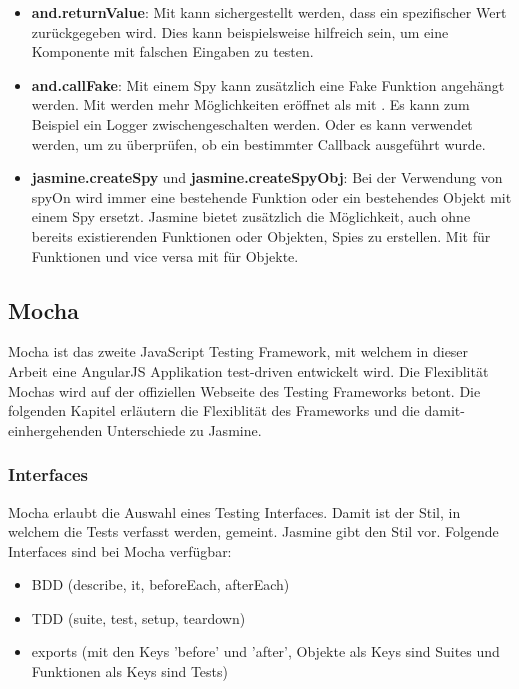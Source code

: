 \begin{itemize}
  \item \textbf{and.returnValue}: \newline
  Mit  kann sichergestellt werden, dass ein spezifischer Wert zurückgegeben wird. Dies kann beispielsweise hilfreich sein, um eine Komponente mit falschen Eingaben zu testen.

  \item \textbf{and.callFake}: \newline
  Mit einem Spy kann zusätzlich eine Fake Funktion angehängt werden. Mit  werden mehr Möglichkeiten eröffnet als mit . Es kann zum Beispiel ein Logger zwischengeschalten werden. Oder es kann verwendet werden, um zu überprüfen, ob ein bestimmter Callback ausgeführt wurde.

  \item \textbf{jasmine.createSpy} und \textbf{jasmine.createSpyObj}: \newline
  Bei der Verwendung von spyOn wird immer eine bestehende Funktion oder ein bestehendes Objekt mit einem Spy ersetzt. Jasmine bietet zusätzlich die Möglichkeit, auch ohne bereits existierenden Funktionen oder Objekten, Spies zu erstellen. Mit  für Funktionen und vice versa mit  für Objekte.

\end{itemize}

\newpage
\subsection{Mocha}
Mocha ist das zweite JavaScript Testing Framework, mit welchem in dieser Arbeit eine AngularJS Applikation test-driven entwickelt wird. Die Flexiblität Mochas wird auf der offiziellen Webseite des Testing Frameworks  betont. Die folgenden Kapitel erläutern die Flexiblität des Frameworks und die damit-einhergehenden Unterschiede zu Jasmine.

\subsubsection{Interfaces}
Mocha erlaubt die Auswahl eines Testing Interfaces. Damit ist der Stil, in welchem die Tests verfasst werden, gemeint. Jasmine gibt den Stil  vor. Folgende Interfaces sind bei Mocha verfügbar:
\begin{itemize}
  \item BDD (describe, it, beforeEach, afterEach)
  \item TDD (suite, test, setup, teardown)
  \item exports (mit den Keys 'before' und 'after', Objekte als Keys sind Suites und Funktionen als Keys sind Tests)
\end{itemize}


